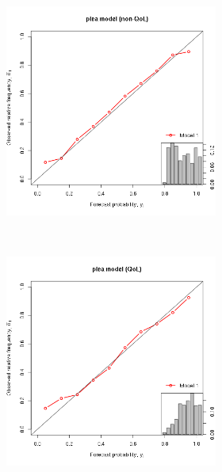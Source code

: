 \begin{figure}[h]
    \begin{subfigure}[p!]{\textwidth}
    \caption{Plea Rates Modeled using GLM}
        \begin{subfigure}[p1]{0.49\textwidth}
            \includegraphics[width=\textwidth]{figures/glmplots/plea_fc.png}

        \end{subfigure}
        ~
        \begin{subfigure}[p1]{0.49\textwidth}
            \includegraphics[width=\textwidth]{figures/glmplots/pleaq_fc.png}

        \end{subfigure}
    \end{subfigure}

\end{figure}

